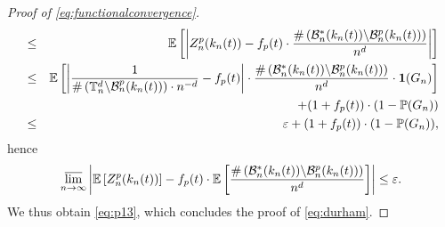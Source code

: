 \documentclass[a4paper,11pt]{article}
\begin{document}
\begin{proof}[Proof of \eqref{eq:functionalconvergence}]
\begin{eqnarray*}
&\leq&\mathbb{E}\left[\left|Z_n^p(k_n(t))-f_p(t)\cdot\frac{\#\left(\mathcal{B}_n^*(k_n(t))\middle\backslash\mathcal{B}_n^p(k_n(t))\right)}{n^d}\right|\right]\\
&\leq&\mathbb{E}\left[\left|\frac{1}{\#\left(\mathbb{T}_n^d\middle\backslash\mathcal{B}_n^p(k_n(t))\right)\cdot n^{-d}}-f_p(t)\right|\cdot\frac{\#\left(\mathcal{B}_n^*(k_n(t))\middle\backslash\mathcal{B}_n^p(k_n(t))\right)}{n^d}\cdot\mathbf{1}(G_n)\right]\\
&&+(1+f_p(t))\cdot(1-\mathbb{P}(G_n))\\
&\leq&\varepsilon+(1+f_p(t))\cdot(1-\mathbb{P}(G_n)),
\end{eqnarray*}
hence
\[\varlimsup_{n\to\infty}\left|\mathbb{E}\left[Z_n^p(k_n(t))\right]-f_p(t)\cdot\mathbb{E}\left[\frac{\#\left(\mathcal{B}_n^*(k_n(t))\middle\backslash\mathcal{B}_n^p(k_n(t))\right)}{n^d}\right]\right|\leq\varepsilon.\]
We thus obtain \eqref{eq:p13}, which concludes the proof of \eqref{eq:durham}.


\end{proof}
\end{document}
